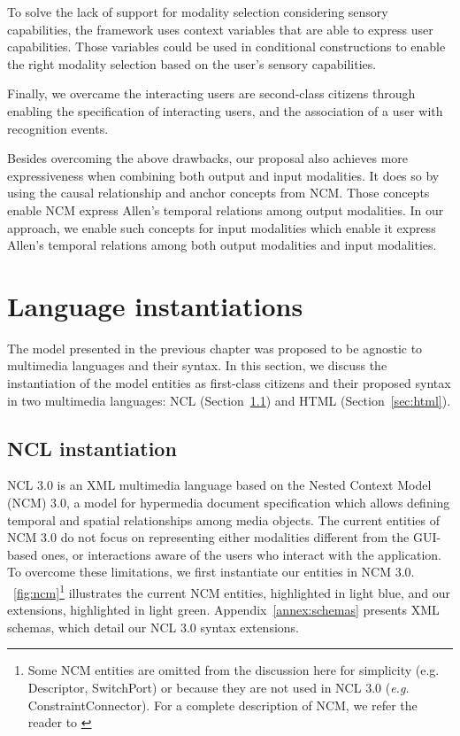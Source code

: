 \documentclass[
  doutorado,
  american
]{ThesisPUC}
\newcommand{\fig}[1]{\figurename~\ref{#1}}
\newcommand{\appen}[1]{Appendix~\ref{#1}}
\newcommand{\sect}[1]{Section~\ref{#1}}
\begin{document}
To solve the lack of support for modality selection considering sensory
capabilities, the framework uses context variables that are able to express user
capabilities. Those variables could be used in conditional constructions to
enable the right modality selection based on the user’s sensory capabilities.

Finally, we overcame the interacting users are second-class citizens through
enabling the specification of interacting users, and the association of a user
with recognition events.

Besides overcoming the above drawbacks, our proposal also achieves more
expressiveness when combining both output and input modalities. It does so by
using the causal relationship and anchor concepts from NCM. Those concepts
enable NCM express Allen’s temporal relations among output modalities. In our
approach, we enable such concepts for input modalities which enable it express
Allen’s temporal relations among both output modalities and input modalities.

\chapter{Language instantiations}
\label{chp:instantiation}

The model presented in the previous chapter was proposed to be agnostic to 
multimedia languages and their syntax. In this section, we discuss the 
instantiation of the model entities as first-class citizens and their proposed 
syntax in two multimedia languages: NCL (\sect{sec:ncl}) and 
HTML (\sect{sec:html}).

\section{NCL instantiation}
\label{sec:ncl}

NCL 3.0 is an XML multimedia language based on the Nested Context Model (NCM)
3.0, a model for hypermedia document specification which allows defining
temporal and spatial relationships among media objects. The current entities of
NCM 3.0 do not focus on representing either modalities different from the
GUI-based ones, or interactions aware of the users who interact with the
application. To overcome these limitations, we first instantiate our entities in
NCM 3.0. \fig{fig:ncm}\footnote{Some NCM entities are omitted from the 
discussion here for simplicity (e.g. Descriptor, SwitchPort) or because they 
are not used in NCL 3.0 (\textit{e.g.} ConstraintConnector). For a complete 
description of NCM, we refer the reader to \cite{soares_nested_2009}} 
illustrates the current NCM entities, highlighted in light blue, and our 
extensions, highlighted in light green. \appen{annex:schemas} presents XML 
schemas, which detail our NCL 3.0 syntax extensions.
\end{document}
